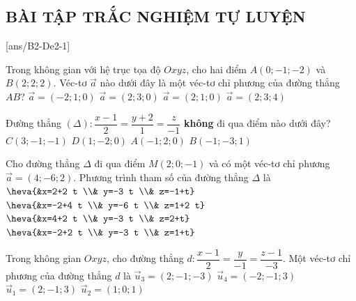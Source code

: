 \subsection{BÀI TẬP TRẮC NGHIỆM TỰ LUYỆN}
\TN
	\setcounter{ex}{0}
	[ans/B2-De2-1]
\begin{ex}%
	Trong không gian với hệ trục tọa độ $O x y z$, cho hai điểm $A(0 ;-1 ;-2)$ và $B(2 ; 2 ; 2)$. Véc-tơ $\overrightarrow{a}$ nào dưới đây là một véc-tơ chỉ phương của đường thẳng $A B$?
	\choice
	{$\overrightarrow{a}=(-2 ; 1 ; 0)$}
	{$\overrightarrow{a}=(2 ; 3 ; 0)$}
	{$\overrightarrow{a}=(2 ; 1 ; 0)$}
	{\True $\overrightarrow{a}=(2 ; 3 ; 4)$}
\end{ex}

\begin{ex}%
	Đường thẳng $(\Delta)\colon \dfrac{x-1}{2}=\dfrac{y+2}{1}=\dfrac{z}{-1}$ \textbf{không} đi qua điểm nào dưới đây?
	\choice
	{$C(3 ;-1 ;-1)$}
	{$D(1 ;-2 ; 0)$}
	{\True $A(-1 ; 2 ; 0)$}
	{$B(-1 ;-3 ; 1)$}
\end{ex}

\begin{ex}%
	Cho đường thẳng $\Delta$ đi qua điểm $M(2 ; 0 ;-1)$ và có một véc-tơ chỉ phương $\overrightarrow{a}=(4 ;-6 ; 2)$. Phương trình tham số của đường thẳng $\Delta$ là
	\choice
	{\True $\heva{&x=2+2 t \\& y=-3 t \\& z=-1+t}$}
	{$\heva{&x=-2+4 t \\& y=-6 t \\& z=1+2 t}$}
	{$\heva{&x=4+2 t \\& y=-3 t \\& z=2+t}$}
	{$\heva{&x=-2+2 t \\& y=-3 t \\& z=1+t}$}
\end{ex}

\begin{ex}%
	Trong không gian $Oxyz$, cho đường thẳng $d\colon \dfrac{x-1}{2}=\dfrac{y}{-1}=\dfrac{z-1}{-3}$. Một véc-tơ chỉ phương của đường thẳng $d$ là
	\choice
	{\True $\overrightarrow{u}_3=(2 ; -1 ; -3)$}
	{$\overrightarrow{u}_4=(-2 ;-1 ; 3)$}
	{$\overrightarrow{u}_1=(2 ;-1 ; 3)$}
	{ $\overrightarrow{u}_2=(1 ; 0 ; 1)$}
\end{ex}

